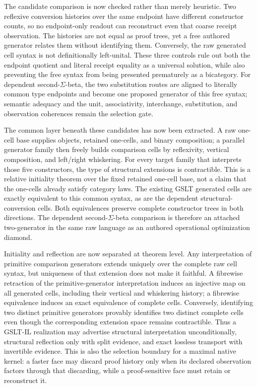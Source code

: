 \documentclass[11pt]{article}
\begin{document}
The candidate comparison is now checked rather than merely heuristic.  Two
reflexive conversion histories over the same endpoint have different
constructor counts, so no endpoint-only readout can reconstruct even that
coarse receipt observation.  The histories are not equal as proof trees, yet a
free authored generator relates them without identifying them.  Conversely,
the raw generated cell syntax is not definitionally left-unital.  These three
controls rule out both the endpoint quotient and literal receipt equality as a
universal solution, while also preventing the free syntax from being presented
prematurely as a bicategory.  For dependent second-$\Sigma$-beta, the two
substitution routes are aligned to literally common type endpoints and become
one proposed generator of this free syntax; semantic adequacy and the unit,
associativity, interchange, substitution, and observation coherences remain the
selection gate.

The common layer beneath these candidates has now been extracted.  A raw
one-cell base supplies objects, retained one-cells, and binary composition; a
parallel generator family then freely builds comparison cells by reflexivity,
vertical composition, and left/right whiskering.  For every target family that
interprets those five constructors, the type of structural extensions is
contractible.  This is a relative initiality theorem over the fixed retained
one-cell base, not a claim that the one-cells already satisfy category laws.
The existing GSLT generated cells are exactly equivalent to this common syntax,
as are the dependent structural-conversion cells.  Both equivalences preserve
complete constructor trees in both directions.  The dependent
second-$\Sigma$-beta comparison is therefore an attached two-generator in the
same raw language as an authored operational optimization diamond.

Initiality and reflection are now separated at theorem level.  Any
interpretation of primitive comparison generators extends uniquely over the
complete raw cell syntax, but uniqueness of that extension does not make it
faithful.  A fibrewise retraction of the primitive-generator interpretation
induces an injective map on all generated cells, including their vertical and
whiskering history; a fibrewise equivalence induces an exact equivalence of
complete cells.  Conversely, identifying two distinct primitive generators
provably identifies two distinct complete cells even though the corresponding
extension space remains contractible.  Thus a GSLT-IL realization may advertise
structural interpretation unconditionally, structural reflection only with
split evidence, and exact lossless transport with invertible evidence.  This is
also the selection boundary for a maximal native kernel: a faster face may
discard proof history only when its declared observation factors through that
discarding, while a proof-sensitive face must retain or reconstruct it.
\end{document}
